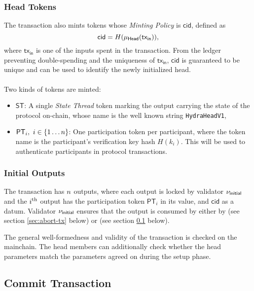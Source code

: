 \subsubsection{Head Tokens}

The \mtxInit{} transaction also mints tokens whose \emph{Minting Policy} is $\mathsf{cid}$, defined as 
$$
\mathsf{cid} = H(\mu_\mathsf{Head}(\mathsf{tx_{in}})),
$$
where $\mathsf{tx_{in}}$ is one of the inputs spent in the \mtxInit{} transaction. From the ledger preventing double-spending and the uniqueness of $\mathsf{tx_{in}}$, $\mathsf{cid}$ is guaranteed to be unique and can be used to identify the newly initialized head. \\
\\
Two kinds of tokens are minted:
\begin{itemize}
\item $\mathsf{ST}$: A single \emph{State Thread} token marking the output carrying the state of the protocol on-chain, whose name is the well known string \texttt{HydraHeadV1},
\item $\mathsf{PT}_i,\ i\in \{1 \dots n \}$: One participation token per participant, where the token name is the participant's verification key hash $H(k_i)$. This will be used to authenticate participants in protocol transactions.
\end{itemize}

\subsubsection{Initial Outputs}

The \mtxInit{} transaction has $n$ outputs, where each output is
locked by validator $\nu_\mathsf{initial}$ and the $i^{\text{th}}$ output has the participation
token $\mathsf{PT}_i$ in its value, and $\mathsf{cid}$ as a datum. Validator $\nu_\mathsf{initial}$
ensures that the output is consumed by either by \mtxAbort{} (see section \ref{sec:abort-tx} below) or \mtxCom{} (see section \ref{sec:commit-tx} below).

The general well-formedness and validity of the \mtxInit{} transaction is
checked on the mainchain. The head members can additionally check whether the head
parameters match the parameters agreed on during the setup phase.

\subsection{Commit Transaction}\label{sec:commit-tx}



